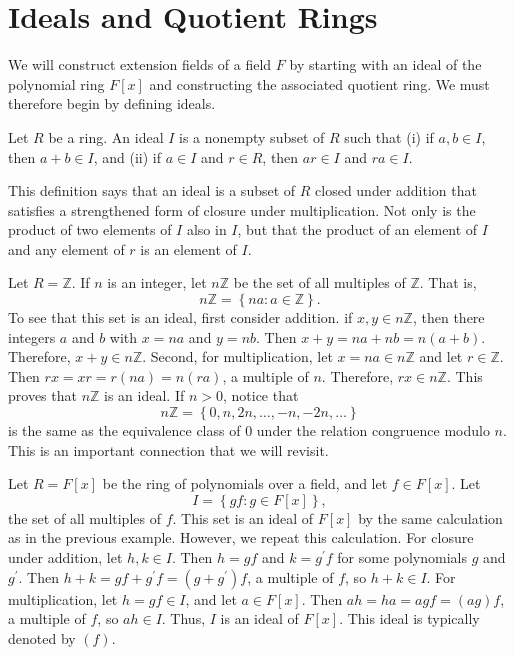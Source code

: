 \section{Ideals and Quotient Rings}

We will construct extension fields of a field $F$ by starting with an ideal of
the polynomial ring $F[x]$ and constructing the associated quotient ring. We
must therefore begin by defining ideals.

\begin{definition}%
%
Let $R$ be a ring. An ideal $I$ is a nonempty subset of $R$ such that (i) if
$a,b\in I$, then $a+b\in I$, and (ii) if $a\in I$ and $r\in R$, then $ar\in I$
and $ra\in I$.
\end{definition}

This definition says that an ideal is a subset of $R$ closed under addition
that satisfies a strengthened form of closure under multiplication. Not only
is the product of two elements of $I$ also in $I$, but that the product of an
element of $I$ and any element of $r$ is an element of $I$.

\begin{example}
Let $R=\mathbb{Z}$. If $n$ is an integer, let $n\mathbb{Z}$ be the set of all
multiples of $\mathbb{Z}$. That is,
\[
n\mathbb{Z}=\left\{  na:a\in\mathbb{Z}\right\}  .
\]
To see that this set is an ideal, first consider addition. if $x,y\in
n\mathbb{Z}$, then there integers $a$ and $b$ with $x=na$ and $y=nb$. Then
$x+y=na+nb=n(a+b)$. Therefore, $x+y\in n\mathbb{Z}$. Second, for
multiplication, let $x=na\in n\mathbb{Z}$ and let $r\in\mathbb{Z}$. Then
$rx=xr=r(na)=n(ra)$, a multiple of $n$. Therefore, $rx\in n\mathbb{Z}$. This
proves that $n\mathbb{Z}$ is an ideal. If $n>0$, notice that
\[
n\mathbb{Z=}\left\{  0,n,2n,\ldots,-n,-2n,\ldots\right\}
\]
is the same as the equivalence class of $0$ under the relation congruence
modulo $n$. This is an important connection that we will revisit.
\end{example}

\begin{example}
Let $R=F[x]$ be the ring of polynomials over a field, and let $f\in F[x]$.
Let
\[
I=\left\{  gf:g\in F[x]\right\}  ,
\]
the set of all multiples of $f$. This set is an ideal of $F[x]$ by the same
calculation as in the previous example. However, we repeat this calculation.
For closure under addition, let $h,k\in I$. Then $h=gf$ and $k=g^{\prime}f$
for some polynomials $g$ and $g^{\prime}$. Then $h+k=gf+g^{\prime
}f=(g+g^{\prime})f$, a multiple of $f$, so $h+k\in I$. For multiplication, let
$h=gf\in I$, and let $a\in F[x]$. Then $ah=ha=agf=(ag)f$, a multiple of $f$,
so $ah\in I$. Thus, $I$ is an ideal of $F[x]$. This ideal is typically denoted
by $(f)$.
\end{example}

